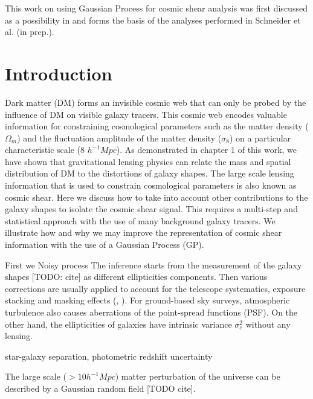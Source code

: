  
This work on using Gaussian Process for cosmic shear analysis 
was first discussed as a possibility in  \citep{Schneider2014}  and 
forms the basis of the analyses performed in Schneider et al. (in prep.).

\section{Introduction} 
Dark matter (DM) forms an invisible cosmic web that can only be
probed by the influence of DM on visible galaxy tracers. 
This cosmic web encodes valuable information for constraining cosmological
parameters such as the matter density ($\Omega_m$) and the fluctuation amplitude 
of the matter density ($\sigma_8$) on a particular characteristic scale (8
$h^{-1} Mpc$). 
As demonstrated in chapter 1 of this work, we have shown that gravitational
lensing physics can relate the mass and spatial distribution of DM to the distortions
of galaxy shapes.  
The large scale lensing information that is used to constrain cosmological 
parameters is also known as cosmic shear. 
Here we discuss how to take into account other contributions to the galaxy shapes
to isolate the cosmic shear signal. 
This requires a multi-step and statistical approach with the use of many 
background galaxy tracers. We
illustrate how and why we may improve the representation of cosmic shear
information with the use of a Gaussian Process (GP). 




First we Noisy process 
The inference starts from the measurement of the galaxy shapes [TODO: cite] as different
ellipticities components. Then various corrections are usually applied to 
account for the telescope systematics, exposure stacking and masking effects 
(\citealt{Rowe2010}, \citealt{Jee2013a}). For ground-based sky surveys,   
atmospheric turbulence also causes aberrations of the point-spread functions
(PSF). On the other hand, the ellipticities of galaxies have intrinsic
variance $\sigma_e^2$ without any lensing.    


star-galaxy separation, photometric redshift uncertainty  

The large scale ($> 10 h^{-1} Mpc$) matter perturbation of the universe can be  
described by a Gaussian random field [TODO cite].  






